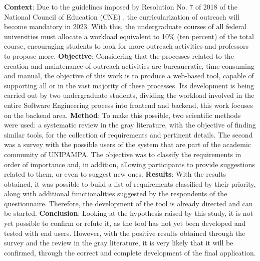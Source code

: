 \begin{resumo}[Abstract]

\textbf{Context}: Due to the guidelines imposed by Resolution No. 7 of 2018 of the National Council of Education (CNE) \cite{Resolucao-MEC:2018}, the curricularization of outreach will become mandatory in 2023. With this, the undergraduate courses of all federal universities must allocate a workload equivalent to 10\% (ten percent) of the total course, encouraging students to look for more outreach activities and professors to propose more.
\textbf{Objective}: Considering that the processes related to the creation and maintenance of outreach activities are bureaucratic, time-consuming and manual, the objective of this work is to produce a web-based tool, capable of supporting all or in the vast majority of these processes. Its development is being carried out by two undergraduate students, dividing the workload involved in the entire Software Engineering process into frontend and backend, this work focuses on the backend area.
\textbf{Method}: To make this possible, two scientific methods were used:
a systematic review in the gray literature, with the objective of finding similar tools, for the collection of requirements and pertinent details. The second was a survey with the possible users of the system that are part of the academic community of UNIPAMPA. The objective was to classify the requirements in order of importance and, in addition, allowing participants to provide suggestions related to them, or even to suggest new ones.
\textbf{Results}: With the results obtained, it was possible to build a list of requirements classified by their priority, along with additional functionalities suggested by the respondents of the questionnaire. Therefore, the development of the tool is already directed and can be started.
\textbf{Conclusion}: Looking at the hypothesis raised by this study, it is not yet possible to confirm or refute it, as the tool has not yet been developed and tested with end users. However, with the positive results obtained through the survey and the review in the gray literature, it is very likely that it will be confirmed, through the correct and complete development of the final application.


\end{resumo}
